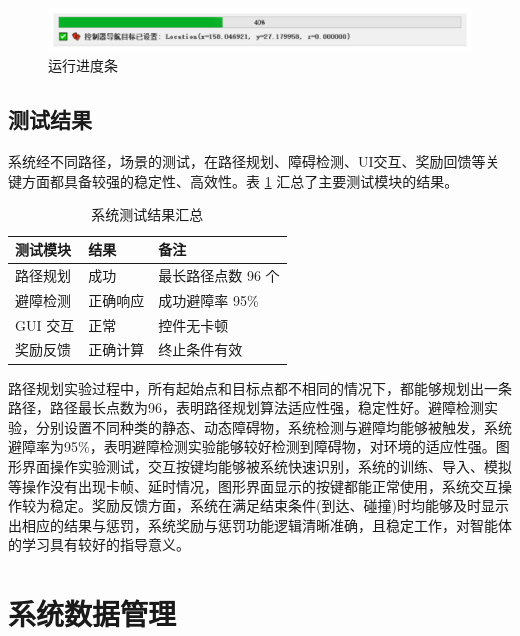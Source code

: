 \begin{figure}[H]
    \centering
    \includegraphics[width=1\textwidth]{images/progress_bar.pdf}
    \caption{运行进度条}
    \label{fig:progress_bar}
\end{figure}

\subsection{测试结果}

系统经不同路径，场景的测试，在路径规划、障碍检测、UI交互、奖励回馈等关键方面都具备较强的稳定性、高效性。表 \ref{tab:test-results} 汇总了主要测试模块的结果。

\begin{table}[H]
    \centering
    \caption{系统测试结果汇总}
    \label{tab:test-results}
    \renewcommand{\arraystretch}{1.3}
    \begin{tabular}{
        >{\centering\arraybackslash}p{4cm}
        >{\centering\arraybackslash}p{3cm}
        >{\centering\arraybackslash}p{6cm}
    }
    \toprule
    \textbf{测试模块} & \textbf{结果} & \textbf{备注} \\
    \midrule
    路径规划 & 成功 & 最长路径点数 96 个 \\
    避障检测 & 正确响应 & 成功避障率 95\% \\
    GUI 交互 & 正常 & 控件无卡顿 \\
    奖励反馈 & 正确计算 & 终止条件有效 \\
    \bottomrule
    \end{tabular}
\end{table}

路径规划实验过程中，所有起始点和目标点都不相同的情况下，都能够规划出一条路径，路径最长点数为96，表明路径规划算法适应性强，稳定性好。避障检测实验，分别设置不同种类的静态、动态障碍物，系统检测与避障均能够被触发，系统避障率为95\%，表明避障检测实验能够较好检测到障碍物，对环境的适应性强。图形界面操作实验测试，交互按键均能够被系统快速识别，系统的训练、导入、模拟等操作没有出现卡帧、延时情况，图形界面显示的按键都能正常使用，系统交互操作较为稳定。奖励反馈方面，系统在满足结束条件(到达、碰撞)时均能够及时显示出相应的结果与惩罚，系统奖励与惩罚功能逻辑清晰准确，且稳定工作，对智能体的学习具有较好的指导意义。

\section{系统数据管理}

